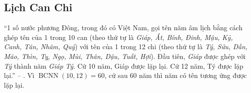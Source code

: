\documentclass{article}
\numberwithin{equation}{section}
\begin{document}
\subsection{Lịch Can Chi}
``1 số nước phương Đông, trong đó có Việt Nam, gọi tên năm âm lịch bằng cách ghép tên của 1 trong 10 can (theo thứ tự là \textit{Giáp, Ất, Bính, Đinh, Mậu, Kỷ, Canh, Tân, Nhâm, Quý}) với tên của 1 trong 12 chi (theo thứ tự là \textit{Tý, Sửu, Dần, Mão, Thìn, Tỵ, Ngọ, Mùi, Thân, Dậu, Tuất, Hợi}). Đầu tiên, \textit{Giáp} được ghép với \textit{Tý} thành năm \textit{Giáp Tý}. Cứ 10 năm, Giáp được lặp lại. Cứ 12 năm, Tý được lặp lại.'' -- \cite[p. 58]{SGK_Toan_6_Canh_Dieu_tap_1}. Vì $\operatorname{BCNN}(10,12) = 60$, cứ sau 60 năm thì năm có tên tương ứng được lặp lại.

\end{document}
